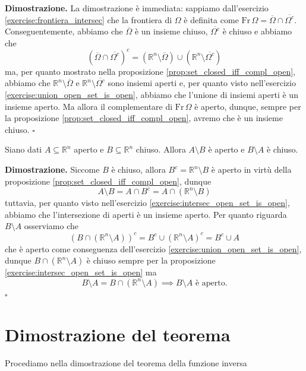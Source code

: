 %
\noindent \textbf{Dimostrazione. }
    La dimostrazione è immediata: sappiamo dall'esercizio \ref{exercise:frontiera_intersec} che la frontiera di $\Omega$ è definita come $\text{Fr} \, \Omega = \overline{\Omega} \cap \overline{\Omega^c}$. Conseguentemente,
    abbiamo che $\overline{\Omega}$ è un insieme chiuso, $\overline{\Omega^c}$ è chiuso e abbiamo che
    \[
        (\overline{\Omega} \cap \overline{\Omega^c})^c = (\mathbb{R}^n \setminus \overline{\Omega}) \cup (\mathbb{R}^n \setminus \overline{\Omega^c})
    \]
    ma, per quanto mostrato nella proposizione \ref{prop:set_closed_iff_compl_open}, abbiamo che $\mathbb{R}^n \setminus \overline{\Omega}$ e $\mathbb{R}^n \setminus \overline{\Omega^c}$ sono insiemi aperti e, per quanto visto nell'esercizio \ref{exercise:union_open_set_is_open}, abbiamo che
    l'unione di insiemi aperti è un insieme aperto. Ma allora il complementare di $\text{Fr} \, \Omega$ è aperto, dunque, sempre per la proposizione \ref{prop:set_closed_iff_compl_open}, avremo che è un insieme chiuso.
\hfill $\square$
%
\vspace{0.5cm}
\begin{lemma}
    Siano dati $A \subseteq \mathbb{R}^n$ aperto e $B \subseteq \mathbb{R}^n$ chiuso. Allora $A \setminus B$ è aperto e $B \setminus A$ è chiuso.
    \label{lemma:diff_open_closed_set}
\end{lemma}
%
\noindent \textbf{Dimostrazione. }
    Siccome $B$ è chiuso, allora $B^c = \mathbb{R}^n \setminus B$ è aperto in virtù della proposizione \ref{prop:set_closed_iff_compl_open}, dunque 
    \[
    A \setminus B = A \cap B^c = A \cap (\mathbb{R}^n \setminus B)
    \]
    tuttavia, per quanto visto nell'esercizio \ref{exercise:intersec_open_set_is_open}, abbiamo che l'intersezione di aperti è un insieme aperto. Per quanto riguarda $B \setminus A$ osserviamo che
    \[
    (B \cap (\mathbb{R}^n \setminus A))^c = B^c \cup (\mathbb{R}^n \setminus A)^c = B^c \cup A
    \]
    che è aperto come conseguenza dell'esercizio \ref{exercise:union_open_set_is_open}, dunque $B \cap (\mathbb{R}^n \setminus A)$ è chiuso sempre per la proposizione \ref{exercise:intersec_open_set_is_open} ma
    \[
    B \setminus A = B \cap (\mathbb{R}^n \setminus A) \implies B \setminus A \text{ è aperto.}
    \]
\hfill $\square$
%
\vspace{0.5cm}
\section{Dimostrazione del teorema}
Procediamo nella dimostrazione del teorema della funzione inversa

